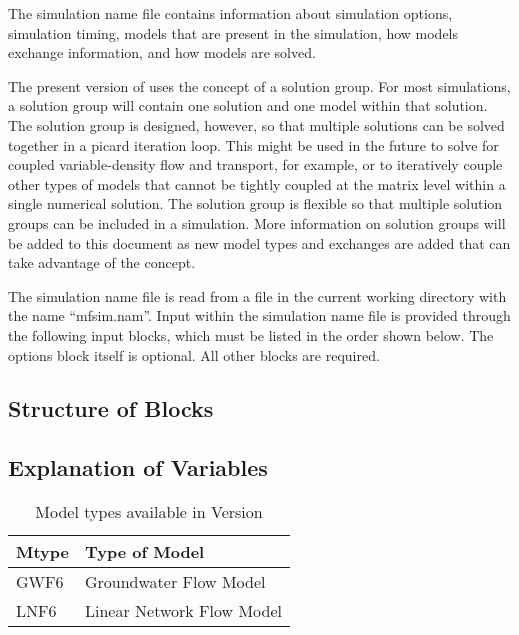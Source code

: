 The simulation name file contains information about simulation options, simulation timing, models that are present in the simulation, how models exchange information, and how models are solved.

The present version of \mf uses the concept of a solution group.  For most simulations, a solution group will contain one solution and one model within that solution.  The solution group is designed, however, so that multiple solutions can be solved together in a picard iteration loop.  This might be used in the future to solve for coupled variable-density flow and transport, for example, or to iteratively couple other types of models that cannot be tightly coupled at the matrix level within a single numerical solution.  The solution group is flexible so that multiple solution groups can be included in a simulation.  More information on solution groups will be added to this document as new model types and exchanges are added that can take advantage of the concept.

The simulation name file is read from a file in the current working directory with the name ``mfsim.nam''.  Input within the simulation name file is provided through the following input blocks, which must be listed in the order shown below.  The options block itself is optional.  All other blocks are required.

\vspace{5mm}
\subsection{Structure of Blocks}






\vspace{5mm}
\subsection{Explanation of Variables}
\begin{description}

\end{description}

\begin{table}[h]
\caption{Model types available in Version \modflowversion}
\small
\begin{center}
\begin{tabular*}{\columnwidth}{l l}
\hline
\hline
Mtype & Type of Model \\
\hline
GWF6 & Groundwater Flow Model \\
LNF6 & Linear Network Flow Model \\
\hline 
\end{tabular*}
\label{table:mtype}
\end{center}
\normalsize
\end{table}

